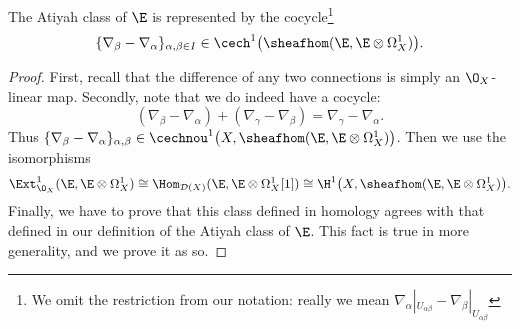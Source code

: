         \begin{lemma}\label{lemma:atiyah-class-difference-of-connections}
            The Atiyah class of $\E$ is represented by the cocycle\footnote{We omit the restriction from our notation: really we mean $\nabla_\alpha|_{U_{\alpha\beta}}-\nabla_\beta|_{U_{\alpha\beta}}$}
            \[
                \{\nabla_\beta-\nabla_\alpha\}_{\alpha,\beta\in I} \in\cech^1\big(\sheafhom(\E,\E\otimes\Omega_X^1)\big).\qedhere
            \]
        \end{lemma}

        \begin{proof}
            First, recall that the difference of any two connections is simply an $\O_X$-linear map.
            Secondly, note that we do indeed have a cocycle:
            \[
                (\nabla_\beta-\nabla_\alpha) + (\nabla_\gamma-\nabla_\beta) = \nabla_\gamma-\nabla_\alpha.
            \]
            Thus $\{\nabla_\beta-\nabla_\alpha\}_{\alpha,\beta}\in\cechnou^1\big(X,\sheafhom(\E,\E\otimes\Omega_X^1)\big)$.
            Then we use the isomorphisms
            \[
                \Ext_{\O_X}^1(\E,\E\otimes\Omega_X^1) \cong \Hom_{\mathcal{D}(X)}(\E,\E\otimes\Omega_X^1[1]) \cong \H^1\big(X,\sheafhom(\E,\E\otimes\Omega_X^1)\big).
            \]
            Finally, we have to prove that this class defined in homology agrees with that defined in our definition of the Atiyah class of $\E$.
            This fact is true in more generality, and we prove it as so.


\end{proof}
